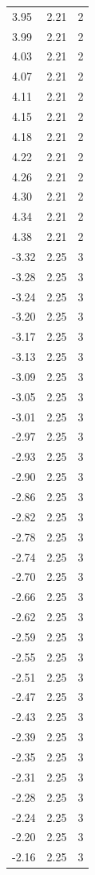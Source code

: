 \begin{longtable}{lrr}
  3.95 & 2.21 & 2 \\
  3.99 & 2.21 & 2 \\
  4.03 & 2.21 & 2 \\
  4.07 & 2.21 & 2 \\
  4.11 & 2.21 & 2 \\
  4.15 & 2.21 & 2 \\
  4.18 & 2.21 & 2 \\
  4.22 & 2.21 & 2 \\
  4.26 & 2.21 & 2 \\
  4.30 & 2.21 & 2 \\
  4.34 & 2.21 & 2 \\
  4.38 & 2.21 & 2 \\
  -3.32 & 2.25 & 3 \\
  -3.28 & 2.25 & 3 \\
  -3.24 & 2.25 & 3 \\
  -3.20 & 2.25 & 3 \\
  -3.17 & 2.25 & 3 \\
  -3.13 & 2.25 & 3 \\
  -3.09 & 2.25 & 3 \\
  -3.05 & 2.25 & 3 \\
  -3.01 & 2.25 & 3 \\
  -2.97 & 2.25 & 3 \\
  -2.93 & 2.25 & 3 \\
  -2.90 & 2.25 & 3 \\
  -2.86 & 2.25 & 3 \\
  -2.82 & 2.25 & 3 \\
  -2.78 & 2.25 & 3 \\
  -2.74 & 2.25 & 3 \\
  -2.70 & 2.25 & 3 \\
  -2.66 & 2.25 & 3 \\
  -2.62 & 2.25 & 3 \\
  -2.59 & 2.25 & 3 \\
  -2.55 & 2.25 & 3 \\
  -2.51 & 2.25 & 3 \\
  -2.47 & 2.25 & 3 \\
  -2.43 & 2.25 & 3 \\
  -2.39 & 2.25 & 3 \\
  -2.35 & 2.25 & 3 \\
  -2.31 & 2.25 & 3 \\
  -2.28 & 2.25 & 3 \\
  -2.24 & 2.25 & 3 \\
  -2.20 & 2.25 & 3 \\
  -2.16 & 2.25 & 3 \\

\end{longtable}
